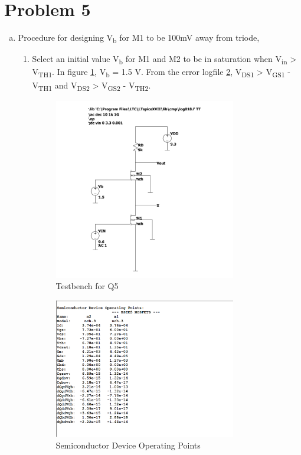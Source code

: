\documentclass{article}
\begin{document}
\section{Problem 5}
\label{sec:org02440e6}
\begin{enumerate}[(a)]
\item Procedure for designing V\textsubscript{b} for M1 to be 100mV away from triode,
\begin{enumerate}
\item Select an initial value V\textsubscript{b} for M1 and M2 to be in saturation when V\textsubscript{in} > V\textsubscript{TH1}. In figure \ref{fig:testbench-q5}, V\textsubscript{b} = 1.5 V.
From the error logfile \ref{fig:errorlog-q5}, V\textsubscript{DS1} > V\textsubscript{GS1} - V\textsubscript{TH1} and V\textsubscript{DS2} > V\textsubscript{GS2} - V\textsubscript{TH2}.
\begin{figure}[H]
\centering
\includegraphics[width=300px]{img/q5/testbench-q5.pdf}
\caption{\label{fig:testbench-q5}Testbench for Q5}
\end{figure}
\begin{figure}[H]
\centering
\includegraphics[width=300px]{img/q5/errorlog-q5.png}
\caption{\label{fig:errorlog-q5}Semiconductor Device Operating Points}

\end{figure}
\end{enumerate}
\end{enumerate}
\end{document}
